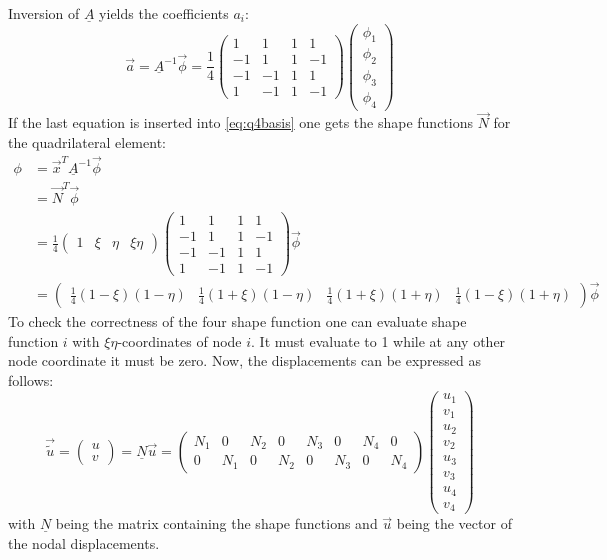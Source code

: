   Inversion of $\underline{A}$ yields the coefficients $a_i$:
  \begin{equation}
  \vec{a} = \underline{A}^{-1}\vec{\phi} = \frac{1}{4} \begin{pmatrix}
  1&1&1&1\\
  -1&1&1&-1\\
  -1&-1&1&1\\
  1&-1&1&-1
  \end{pmatrix} \begin{pmatrix}
  \phi_1\\\phi_2\\\phi_3\\\phi_4
  \end{pmatrix}
  \end{equation}
  If the last equation is inserted into \ref{eq:q4basis} one gets the shape functions $\vec{N}$ for the quadrilateral element:
  \begin{align}
  \phi &= \vec{x}^T\underline{A}^{-1}\vec{\phi} \nonumber\\
    &= \vec{N}^T\vec{\phi} \nonumber\\
    &= \frac{1}{4} \begin{pmatrix}
    1&\xi&\eta&\xi\eta
    \end{pmatrix} \begin{pmatrix}
    1&1&1&1\\
    -1&1&1&-1\\
    -1&-1&1&1\\
    1&-1&1&-1
    \end{pmatrix} \vec{\phi} \nonumber\\
    &= \begin{pmatrix}
    \frac{1}{4}(1-\xi)(1-\eta)&\frac{1}{4}(1+\xi)(1-\eta)&\frac{1}{4}(1+\xi)(1+\eta)&\frac{1}{4}(1-\xi)(1+\eta)
    \end{pmatrix} \vec{\phi}
  \end{align}
  To check the correctness of the four shape function one can evaluate shape function $i$ with $\xi\eta$-coordinates of node $i$. It must evaluate to 1 while at any other node coordinate it must be zero.
  Now, the displacements can be expressed as follows:
  \begin{equation}
  \vec{\tilde{u}} = \begin{pmatrix}
  u\\v
  \end{pmatrix} = \underline{N}\vec{u} = \begin{pmatrix}
  N_1&0&N_2&0&N_3&0&N_4&0\\
  0&N_1&0&N_2&0&N_3&0&N_4
  \end{pmatrix} \begin{pmatrix}
  u_1\\v_1\\u_2\\v_2\\u_3\\v_3\\u_4\\v_4
  \end{pmatrix}
  \end{equation}
  with $\underline{N}$ being the matrix containing the shape functions and $\vec{u}$ being the vector of the nodal displacements.
  
